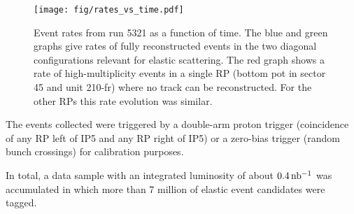 \begin{figure*}
\begin{center}
\texttt{[image: fig/rates\_vs\_time.pdf]}
\caption{%
Event rates from run 5321 as a function of time. The blue and green graphs give rates of fully reconstructed events in the two diagonal configurations relevant for elastic scattering. The red graph shows a rate of high-multiplicity events in a single RP (bottom pot in sector 45 and unit 210-fr) where no track can be reconstructed. For the other RPs this rate evolution was similar.
}
\label{fig:rates_vs_time}
\end{center}
\end{figure*}

The events collected were triggered by a double-arm proton trigger (coincidence of any RP left of IP5 and any RP right of IP5) or a zero-bias trigger (random bunch crossings) for calibration purposes.

In total, a data sample with an integrated luminosity of about $0.4\,\rm nb^{-1}$ was accumulated in which more than 7 million of elastic event candidates were tagged.
